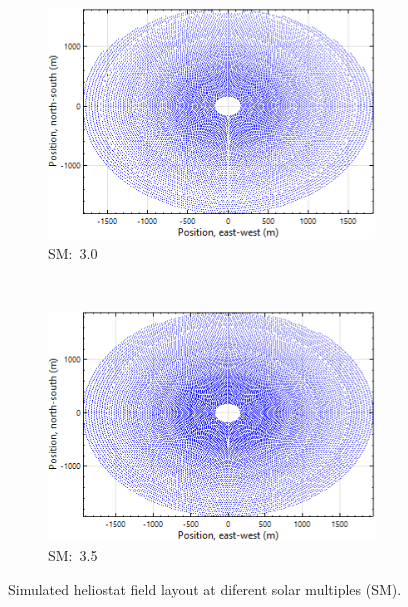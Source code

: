 \begin{figure}[!htbp]
\par\medskip %
                
        \begin{subfigure}[b]{0.5\textwidth}
                \centering
                \includegraphics[width=0.95\textwidth]{FIG/SM30}
                \caption{SM:~3.0}\label{SM3.0}
        \end{subfigure}%
        ~
        \begin{subfigure}[b]{0.5\textwidth}
                \centering
                \includegraphics[width=0.95\textwidth]{FIG/SM35}
                \caption{SM:~3.5}\label{SM3.5}
        \end{subfigure}
        \caption[Simulated heliostat field layout at diferent solar multiples (SM).]{Simulated heliostat field layout at diferent solar multiples (SM).}\label{SM}
\end{figure}
